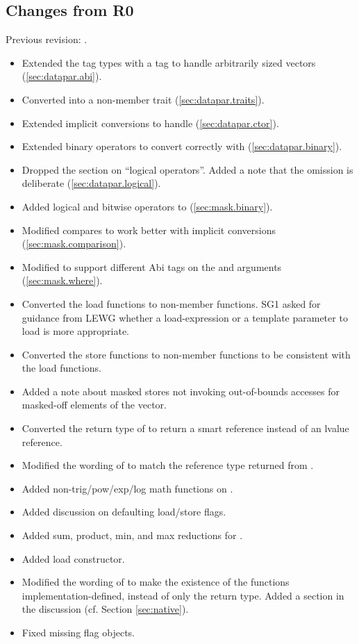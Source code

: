 \subsection{Changes from R0}
Previous revision: \citep{P0214R0}.
\begin{itemize}
  \item Extended the  tag types with a  tag to handle arbitrarily sized vectors (\ref{sec:datapar.abi}).
  \item Converted  into a non-member trait (\ref{sec:datapar.traits}).
  \item Extended implicit conversions to handle \fixedsizeN (\ref{sec:datapar.ctor}).
  \item Extended binary operators to convert correctly with \fixedsizeN (\ref{sec:datapar.binary}).
  \item Dropped the section on “\datapar logical operators”. Added a note that the omission is deliberate (\ref{sec:datapar.logical}).
  \item Added logical and bitwise operators to \mask (\ref{sec:mask.binary}).
  \item Modified \mask compares to work better with implicit conversions (\ref{sec:mask.comparison}).
  \item Modified  to support different Abi tags on the \mask and \datapar arguments (\ref{sec:mask.where}).
  \item Converted the load functions to non-member functions.
    SG1 asked for guidance from LEWG whether a load-expression or a template parameter to load is more appropriate.
  \item Converted the store functions to non-member functions to be consistent with the load functions.
  \item Added a note about masked stores not invoking out-of-bounds accesses for masked-off elements of the vector.
  \item Converted the return type of \datapar{} to return a smart reference instead of an lvalue reference.
  \item Modified the wording of \mask{} to match the reference type returned from \datapar{}.
  \item Added non-trig/pow/exp/log math functions on \datapar.
  \item Added discussion on defaulting load/store flags.
  \item Added sum, product, min, and max reductions for \datapar.
  \item Added load constructor.
  \item Modified the wording of  to make the existence of the functions implementation-defined, instead of only the return type.
    Added a section in the discussion (cf. Section \ref{sec:native}).
  \item Fixed missing flag objects.
\end{itemize}

